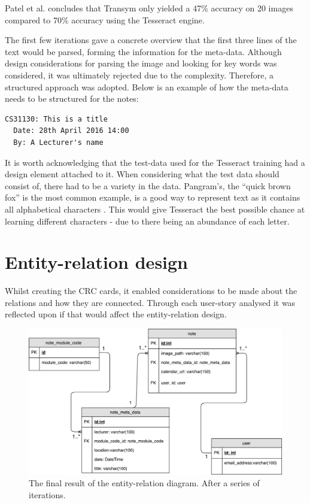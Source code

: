 Patel et al. concludes that Transym only yielded a 47\% accuracy on 20 images compared to 70\% accuracy using the Tesseract engine.

The first few iterations gave a concrete overview that the first three lines of the text would be parsed, forming the information for the meta-data. Although design considerations for parsing the image and looking for key words was considered, it was ultimately rejected due to the complexity. Therefore, a structured approach was adopted. Below is an example of how the meta-data needs to be structured for the notes:

\begin{lstlisting}[caption={An example exert from a valid structured note}, label={lst:mock1}, breaklines, columns=fullflexible, basicstyle=\normalsize\ttfamily]
  CS31130: This is a title
  Date: 28th April 2016 14:00
  By: A Lecturer's name
\end{lstlisting}



It is worth acknowledging that the test-data used for the Tesseract training had a design element attached to it. When considering what the test data should consist of, there had to be a variety in the data. Pangram's, the ``quick brown fox'' is the most common example, is a good way to represent text as it contains all alphabetical characters \cite{citeulike:14023830}. This would give Tesseract the best possible chance at learning different characters - due to there being an abundance of each letter.

\section{Entity-relation design}\label{section:er_diagram}
Whilst creating the CRC cards, it enabled considerations to be made about the relations and how they are connected. Through each user-story analysed it was reflected upon if that would affect the entity-relation design.

\begin{figure}[H]
  \centering
  \includegraphics[scale=0.5]{images/database_diagram.pdf}
  \caption{The final result of the entity-relation diagram. After a series of iterations.}
  \label{fig:database}
\end{figure}

